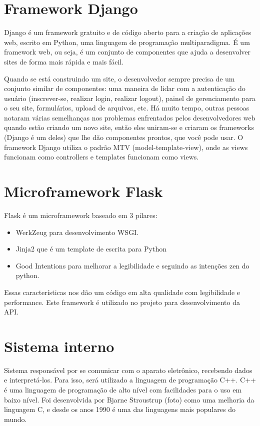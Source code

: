 \section{Framework Django}

Django é um framework gratuito e de código aberto para a criação de aplicações web, escrito em Python, uma linguagem de programação multiparadigma. É um framework web, ou seja, é um conjunto de componentes que ajuda a desenvolver sites de forma mais rápida e mais fácil.

Quando se está construindo um site, o desenvolvedor sempre precisa de um conjunto similar de componentes: uma maneira de lidar com a autenticação do usuário (inscrever-se, realizar login, realizar logout), painel de gerenciamento para o seu site, formulários, upload de arquivos, etc. Há muito tempo, outras pessoas notaram várias semelhanças nos problemas enfrentados pelos desenvolvedores web quando estão criando um novo site, então eles uniram-se e criaram os frameworks (Django é um deles) que lhe dão componentes prontos, que você pode usar. O framework Django utiliza o padrão MTV (model-template-view), onde as views funcionam como controllers e templates funcionam como views. 

\section{Microframework Flask}

Flask é um microframework baseado em 3 pilares: 

\begin{itemize}
\item WerkZeug para desenvolvimento WSGI.
\item Jinja2 que é um template de escrita para Python
\item Good Intentions para melhorar a legibilidade e seguindo as intenções zen do python.
\end{itemize}

Essas características nos dão um código em alta qualidade com legibilidade e performance. 
Este framework é utilizado no projeto para desenvolvimento da API.

\section{Sistema interno}

Sistema responsável por se comunicar com o aparato eletrônico, recebendo dados e interpretá-los. Para isso, será utilizado a linguagem de programação C++. C++ é uma linguagem de programação de alto nível com facilidades para o uso em baixo nível. Foi desenvolvida por Bjarne Stroustrup (foto) como uma melhoria da linguagem C, e desde os anos 1990 é uma das linguagens mais populares do mundo.

